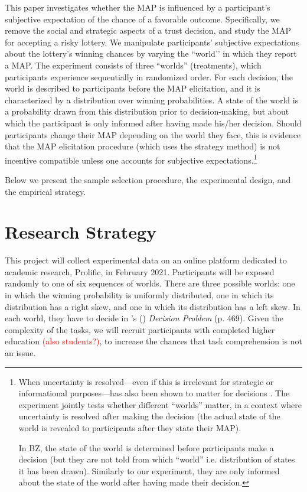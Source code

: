 This paper investigates whether the MAP is influenced by a participant’s subjective expectation of the chance of a favorable outcome. 
Specifically, we remove the social and strategic aspects of a trust decision, and study the MAP for accepting a risky lottery.
We manipulate participants’ subjective expectations about the lottery’s winning chances by varying the ``world’’ in which they report a MAP.
The experiment consists of three ``worlds'' (treatments), which participants experience sequentially in randomized order.
For each decision, the world is described to participants before the MAP elicitation, and it is characterized by a distribution over winning probabilities.
A state of the world is a probability drawn from this distribution prior to decision-making, but about which the participant is only informed after having made his/her decision.
Should participants change their MAP depending on the world they face, this is evidence that the MAP elicitation procedure (which uses the strategy method) is not incentive compatible unless one accounts for subjective expectations.\footnote{
When uncertainty is resolved—even if this is irrelevant for strategic or informational purposes—has also been shown to matter for decisions \citep[see footnote 11 on p. 29 in][]{Johnson2019}.
The experiment jointly tests whether different ``worlds'' matter, in a context where uncertainty is resolved after making the decision (the actual state of the world is revealed to participants after they state their MAP).

In BZ, the state of the world is determined before participants make a decision (but they are not told from which ``world'' i.e. distribution of states it has been drawn).
Similarly to our experiment, they are only informed about the state of the world after having made their decision.
}

Below we present the sample selection procedure, the experimental design, and the empirical strategy.



\section{Research Strategy}
This project will collect experimental data on an online platform dedicated to academic research, Prolific, in February 2021. Participants will be exposed randomly to one of six sequences of worlds.
There are three possible worlds: one in which the winning probability is uniformly distributed, one in which its distribution has a right skew, and one in which its distribution has a left skew.
In each world, they have to decide in \citeauthor{Bohnet2004}'s (\citeyear{Bohnet2004}) \textit{Decision Problem} (p. 469). Given the complexity of the tasks, we will recruit participants with completed higher education \textcolor{red}{(also students?)}, to increase the chances that task comprehension is not an issue.

